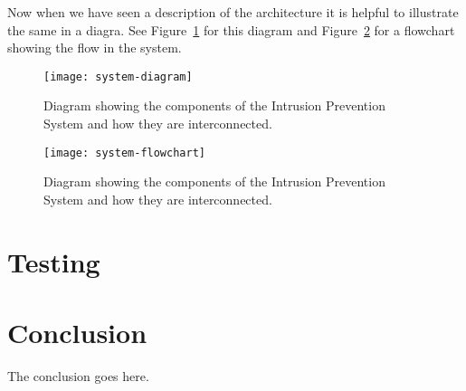 \documentclass[10pt,journal,compsoc]{IEEEtran}
\begin{document}
Now when we have seen a description of the architecture it is helpful to illustrate the same in a diagra.
See Figure~\ref{fig:architecture} for this diagram and Figure~\ref{fig:flowchart} for a flowchart showing
the flow in the system.

\begin{figure}
    \centering
        \texttt{[image: system-diagram]}
    \caption{Diagram showing the components of the Intrusion Prevention System and how they are interconnected.}
    \label{fig:architecture}
\end{figure}

\begin{figure}
    \centering
        \texttt{[image: system-flowchart]}
    \caption{Diagram showing the components of the Intrusion Prevention System and how they are interconnected.}
    \label{fig:flowchart}
\end{figure}




\section{Testing}

\section{Conclusion}
The conclusion goes here.






%
\end{document}
